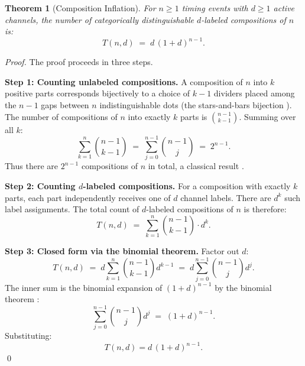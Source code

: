 \documentclass[twocolumn,10pt]{article}
\newtheorem{theorem}{Theorem}[section]
\begin{document}
\begin{theorem}[Composition Inflation]
\label{thm:inflation}
For $n \geq 1$ timing events with $d \geq 1$ active channels, the
number of categorically distinguishable $d$-labeled compositions of
$n$ is:
\begin{equation}
  T(n, d) \;=\; d\,(1 + d)^{n-1}.
  \label{eq:inflation}
\end{equation}
\end{theorem}
\begin{proof}
The proof proceeds in three steps.

\medskip
\noindent\textbf{Step 1: Counting unlabeled compositions.}
A composition of $n$ into $k$ positive parts corresponds bijectively
to a choice of $k-1$ dividers placed among the $n-1$ gaps between $n$
indistinguishable dots (the stars-and-bars bijection
\cite{andrews1976partitions}). The number of compositions of $n$ into
exactly $k$ parts is $\binom{n-1}{k-1}$. Summing over all $k$:
\begin{equation}
  \sum_{k=1}^{n} \binom{n-1}{k-1} \;=\; \sum_{j=0}^{n-1} \binom{n-1}{j}
  \;=\; 2^{n-1}.
  \label{eq:total-comps}
\end{equation}
Thus there are $2^{n-1}$ compositions of $n$ in total, a classical
result \cite{graham1994concrete}.

\medskip
\noindent\textbf{Step 2: Counting $d$-labeled compositions.}
For a composition with exactly $k$ parts, each part independently
receives one of $d$ channel labels. There are $d^k$ such label
assignments. The total count of $d$-labeled compositions of $n$ is
therefore:
\begin{equation}
  T(n,d) \;=\; \sum_{k=1}^{n} \binom{n-1}{k-1} \cdot d^k.
  \label{eq:Tnd-sum}
\end{equation}

\medskip
\noindent\textbf{Step 3: Closed form via the binomial theorem.}
Factor out $d$:
\begin{equation}
  T(n,d) \;=\; d \sum_{k=1}^{n} \binom{n-1}{k-1} d^{k-1}
  \;=\; d \sum_{j=0}^{n-1} \binom{n-1}{j} d^{j}.
  \label{eq:factor}
\end{equation}
The inner sum is the binomial expansion of $(1+d)^{n-1}$ by the
binomial theorem \cite{graham1994concrete}:
\begin{equation}
  \sum_{j=0}^{n-1} \binom{n-1}{j} d^{j}
  \;=\; (1 + d)^{n-1}.
  \label{eq:binom-app}
\end{equation}
Substituting:
\begin{equation}
  T(n,d) = d\,(1+d)^{n-1}.
  \label{eq:Tnd-closed}
\end{equation}
\qed
\end{proof}
\end{document}
